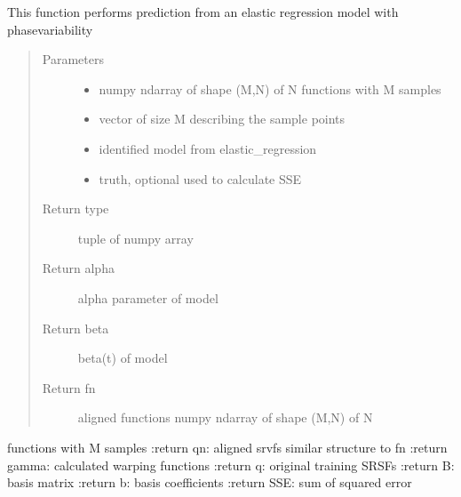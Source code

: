 \documentclass[letterpaper,10pt,english]{sphinxmanual}
\begin{document}
\begin{fulllineitems}
\label{\detokenize{regression:regression.elastic_prediction}}
This function performs prediction from an elastic regression model
with phase\sphinxhyphen{}variability
\begin{quote}\begin{description}
\item[{Parameters}] \leavevmode\begin{itemize}
\item {} 
 \textendash{} numpy ndarray of shape (M,N) of N functions with M samples

\item {} 
 \textendash{} vector of size M describing the sample points

\item {} 
 \textendash{} identified model from elastic\_regression

\item {} 
 \textendash{} truth, optional used to calculate SSE

\end{itemize}

\item[{Return type}] \leavevmode
tuple of numpy array

\item[{Return alpha}] \leavevmode
alpha parameter of model

\item[{Return beta}] \leavevmode
beta(t) of model

\item[{Return fn}] \leavevmode
aligned functions \sphinxhyphen{} numpy ndarray of shape (M,N) of N

\end{description}\end{quote}

functions with M samples
:return qn: aligned srvfs \sphinxhyphen{} similar structure to fn
:return gamma: calculated warping functions
:return q: original training SRSFs
:return B: basis matrix
:return b: basis coefficients
:return SSE: sum of squared error

\end{fulllineitems}
\end{document}
